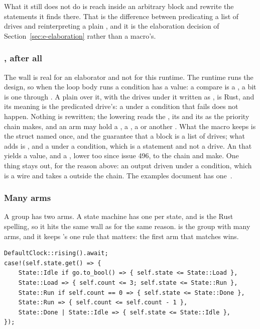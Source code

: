 What it still does not do is reach inside an arbitrary block and rewrite
the statements it finds there. That is the difference between predicating
a list of drives and reinterpreting a plain , and it is the
elaboration decision of Section~\ref{sec:e-elaboration} rather than a
macro's.

\subsubsection{, after all}

The wall is real for an elaborator and not for this runtime. The
runtime runs the design, so when the loop body runs a condition has a
value: a compare is a , a bit is one through
. A plain  over it, with the drives under it
written as , is Rust, and its meaning is the predicated
drive's: a  under a condition that fails does not happen.
Nothing is rewritten; the lowering reads the , its
 and its  as the priority chain 
makes, and an arm may hold a , a , a
 or another . What the macro keeps is the
struct named once, and the guarantee that a block is a list of
drives; what  adds is , and a 
under a condition, which is a statement and not a drive. An 
that yields a value, and a , lower too since issue 496, to
the chain  and  make. One thing stays out, for
the reason above: an output driven under a condition, which is a wire
and takes a  outside the chain.
The examples document has one~\cite{examples}.

\subsubsection{Many arms}
\label{sec:e-case}

A group has two arms. A state machine has one per state, and
 is the Rust spelling, so it hits the same wall as
 for the same reason.  is the group with many
arms, and it keeps 's one rule that matters: the first arm
that matches wins.

\begin{lstlisting}[caption={\code{case!} on a state register. The arms are Rust patterns, guards and alternatives included, and the first match wins, so the guarded arm sits above the plain one for the same state. The full sequencer is \code{ex\_case.rs} in the examples document~\cite{examples}.},label={lst:case}]
DefaultClock::rising().await;
case!(self.state.get() => {
    State::Idle if go.to_bool() => { self.state <= State::Load },
    State::Load => { self.count <= 3; self.state <= State::Run },
    State::Run if self.count == 0 => { self.state <= State::Done },
    State::Run => { self.count <= self.count - 1 },
    State::Done | State::Idle => { self.state <= State::Idle },
});
\end{lstlisting}

